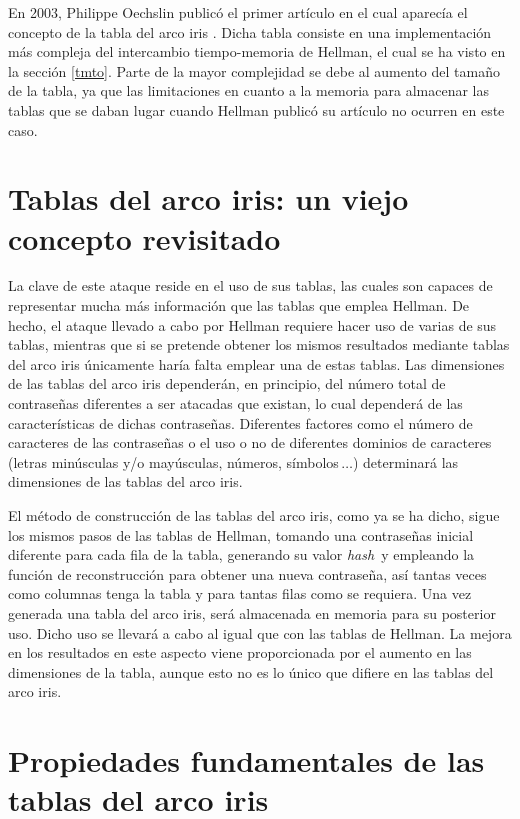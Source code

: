 \documentclass[12pt,spanish,listoffigures,listoftables]{tfgetsinf}
\newcommand{\hash}{\textit{hash}}
\begin{document}
En 2003, Philippe Oechslin publicó el primer artículo en el cual aparecía el concepto de la tabla del arco iris \cite{rainbow}. Dicha tabla consiste en una implementación más compleja del intercambio tiempo-memoria de Hellman, el cual se ha visto en la sección \ref{tmto}. Parte de la mayor complejidad se debe al aumento del tamaño de la tabla, ya que las limitaciones en cuanto a la memoria para almacenar las tablas que se daban lugar cuando Hellman publicó su artículo no ocurren en este caso.

\section{Tablas del arco iris: un viejo concepto revisitado}

La clave de este ataque reside en el uso de sus tablas, las cuales son capaces de representar mucha más información que las tablas que emplea Hellman. De hecho, el ataque llevado a cabo por Hellman requiere hacer uso de varias de sus tablas, mientras que si se pretende obtener los mismos resultados mediante tablas del arco iris únicamente haría falta emplear una de estas tablas. Las dimensiones de las tablas del arco iris dependerán, en principio, del número total de contraseñas diferentes a ser atacadas que existan, lo cual dependerá de las características de dichas contraseñas. Diferentes factores como el número de caracteres de las contraseñas o el uso o no de diferentes dominios de caracteres (letras minúsculas y/o mayúsculas, números, símbolos$\, \dots$) determinará las dimensiones de las tablas del arco iris. 

El método de construcción de las tablas del arco iris, como ya se ha dicho, sigue los mismos pasos de las tablas de Hellman, tomando una contraseñas inicial diferente para cada fila de la tabla, generando su valor \hash~y empleando la función de reconstrucción para obtener una nueva contraseña, así tantas veces como columnas tenga la tabla y para tantas filas como se requiera. Una vez generada una tabla del arco iris, será almacenada en memoria para su posterior uso. Dicho uso se llevará a cabo al igual que con las tablas de Hellman. La mejora en los resultados en este aspecto viene proporcionada por el aumento en las dimensiones de la tabla, aunque esto no es lo único que difiere en las tablas del arco iris.

\section{Propiedades fundamentales de las tablas del arco iris}
\end{document}
